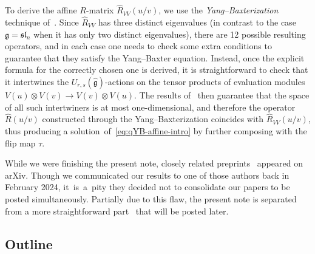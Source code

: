\documentclass[pdftex]{sigma}
\numberwithin{equation}{section}
\newcommand{\fg}{\mathfrak{g}}
\newcommand{\ssl}{\mathfrak{sl}}
\newcommand{\UU}{U_{r,s}(\widehat{\fg})}
\begin{document}
To derive the affine $R$-matrix $\hat{R}_{VV}(u/v)$, we use the \emph{Yang--Baxterization} technique of~\cite{GWX}. Since $\hat{R}_{VV}$ has three distinct eigenvalues (in contrast to the case $\fg=\ssl_n$ when it has only two distinct eigenvalues), there are 12 possible resulting operators, and in each case one needs to check some extra conditions to guarantee that they satisfy the Yang--Baxter equation. Instead, once the explicit formula for the correctly chosen one is derived, it is straightforward to check that it intertwines the $\UU$-actions on the tensor products of evaluation modules $V(u)\otimes V(v)\to V(v)\otimes V(u)$.
The results of~\cite{Jim} then guarantee that the space of all such intertwiners is at most one-dimensional, and therefore the operator $\hat{R}(u/v)$ constructed through the Yang--Baxterization coincides with $\hat{R}_{VV}(u/v)$, thus producing a solution~of~\eqref{eq:qYB-affine-intro} by further composing with the flip map $\tau$.

While we were finishing the present note, closely related preprints~\cite{HXZ1,HJZ,HXZ2} appeared on arXiv. Though we communicated our results to one of those authors back in February 2024, it~is~a~pity they decided not to consolidate our papers to be posted simultaneously. Partially due to this flaw, the present note is separated from a more straightforward part~\cite{MT2} that will be posted later.

\subsection{Outline}%
\end{document}
